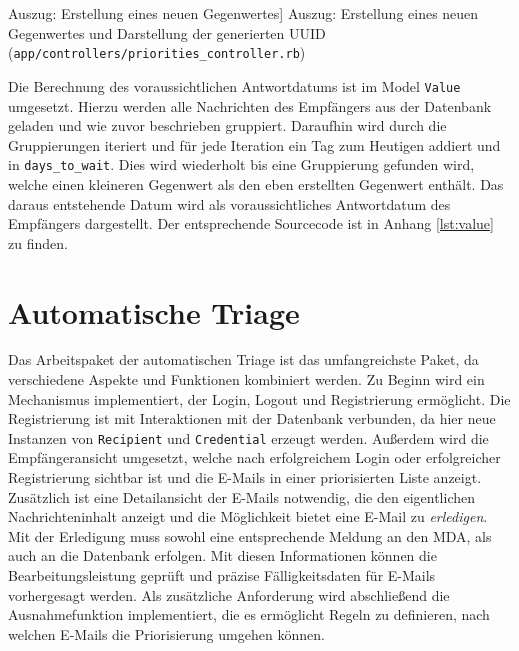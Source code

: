 \begin{listing}[!ht]
\inputminted[firstline=14, lastline=23,linenos]{ruby}{Listings/Pkg2/priorities_controller.rb}

\caption
    [Auszug: Erstellung eines neuen Gegenwertes]
    {Auszug: Erstellung eines neuen Gegenwertes und Darstellung der generierten UUID (\texttt{app/controllers/priorities\_controller.rb})}

\label{lst:priorities_controller}
\end{listing}

\noindent Die Berechnung des voraussichtlichen Antwortdatums ist im Model \texttt{Value} umgesetzt. Hierzu werden alle Nachrichten des Empfängers aus der Datenbank geladen und wie zuvor beschrieben gruppiert. Daraufhin wird durch die Gruppierungen iteriert und für jede Iteration ein Tag zum Heutigen addiert und in \texttt{days\_to\_wait}. Dies wird wiederholt bis eine Gruppierung gefunden wird, welche einen kleineren Gegenwert als den eben erstellten Gegenwert enthält. Das daraus entstehende Datum wird als voraussichtliches Antwortdatum des Empfängers dargestellt. Der entsprechende Sourcecode ist in Anhang \ref{lst:value} zu finden.


\section{Automatische Triage}
\label{Automatische_Triage}

Das Arbeitspaket der automatischen Triage ist das umfangreichste Paket, da verschiedene Aspekte und Funktionen kombiniert werden. Zu Beginn wird ein Mechanismus implementiert, der Login, Logout und Registrierung ermöglicht. Die Registrierung ist mit Interaktionen mit der Datenbank verbunden, da hier neue Instanzen von \texttt{Recipient} und \texttt{Credential} erzeugt werden. Außerdem wird die Empfängeransicht umgesetzt, welche nach erfolgreichem Login oder erfolgreicher Registrierung sichtbar ist und die E-Mails in einer priorisierten Liste anzeigt. Zusätzlich ist eine Detailansicht der E-Mails notwendig, die den eigentlichen Nachrichteninhalt anzeigt und die Möglichkeit bietet eine E-Mail zu \textit{erledigen}. Mit der Erledigung muss sowohl eine entsprechende Meldung an den MDA, als auch an die Datenbank erfolgen. Mit diesen Informationen können die Bearbeitungsleistung geprüft und präzise Fälligkeitsdaten für E-Mails vorhergesagt werden. Als zusätzliche Anforderung wird abschließend die Ausnahmefunktion implementiert, die es ermöglicht Regeln zu definieren, nach welchen E-Mails die Priorisierung umgehen können.

